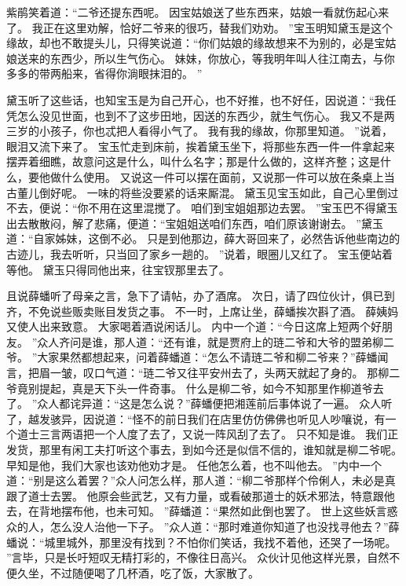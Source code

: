 紫鹃笑着道：“二爷还提东西呢。
因宝姑娘送了些东西来，姑娘一看就伤起心来了。
我正在这里劝解，恰好二爷来的很巧，替我们劝劝。
”宝玉明知黛玉是这个缘故，却也不敢提头儿，只得笑说道：“你们姑娘的缘故想来不为别的，必是宝姑娘送来的东西少，所以生气伤心。
妹妹，你放心，等我明年叫人往江南去，与你多多的带两船来，省得你淌眼抹泪的。
”\par
黛玉听了这些话，也知宝玉是为自己开心，也不好推，也不好任，因说道：“我任凭怎么没见世面，也到不了这步田地，因送的东西少，就生气伤心。
我又不是两三岁的小孩子，你也忒把人看得小气了。
我有我的缘故，你那里知道。
”说着，眼泪又流下来了。
宝玉忙走到床前，挨着黛玉坐下，将那些东西一件一件拿起来摆弄着细瞧，故意问这是什么，叫什么名字；那是什么做的，这样齐整；这是什么，要他做什么使用。
又说这一件可以摆在面前，又说那一件可以放在条桌上当古董儿倒好呢。
一味的将些没要紧的话来厮混。
黛玉见宝玉如此，自己心里倒过不去，便说：“你不用在这里混搅了。
咱们到宝姐姐那边去罢。
”宝玉巴不得黛玉出去散散闷，解了悲痛，便道：“宝姐姐送咱们东西，咱们原该谢谢去。
”黛玉道：“自家姊妹，这倒不必。
只是到他那边，薛大哥回来了，必然告诉他些南边的古迹儿，我去听听，只当回了家乡一趟的。
”说着，眼圈儿又红了。
宝玉便站着等他。
黛玉只得同他出来，往宝钗那里去了。
\par
且说薛蟠听了母亲之言，急下了请帖，办了酒席。
次日，请了四位伙计，俱已到齐，不免说些贩卖账目发货之事。
不一时，上席让坐，薛蟠挨次斟了酒。
薛姨妈又使人出来致意。
大家喝着酒说闲话儿。
内中一个道：“今日这席上短两个好朋友。
”众人齐问是谁，那人道：“还有谁，就是贾府上的琏二爷和大爷的盟弟柳二爷。
”大家果然都想起来，问着薛蟠道：“怎么不请琏二爷和柳二爷来？”薛蟠闻言，把眉一皱，叹口气道：“琏二爷又往平安州去了，头两天就起了身的。
那柳二爷竟别提起，真是天下头一件奇事。
什么是柳二爷，如今不知那里作柳道爷去了。
”众人都诧异道：“这是怎么说？”薛蟠便把湘莲前后事体说了一遍。
众人听了，越发骇异，因说道：“怪不的前日我们在店里仿仿佛佛也听见人吵嚷说，有一个道士三言两语把一个人度了去了，又说一阵风刮了去了。
只不知是谁。
我们正发货，那里有闲工夫打听这个事去，到如今还是似信不信的，谁知就是柳二爷呢。
早知是他，我们大家也该劝他劝才是。
任他怎么着，也不叫他去。
”内中一个道：“别是这么着罢？”众人问怎么样，那人道：“柳二爷那样个伶俐人，未必是真跟了道士去罢。
他原会些武艺，又有力量，或看破那道士的妖术邪法，特意跟他去，在背地摆布他，也未可知。
”薛蟠道：“果然如此倒也罢了。
世上这些妖言惑众的人，怎么没人治他一下子。
”众人道：“那时难道你知道了也没找寻他去？”薛蟠说：“城里城外，那里没有找到？不怕你们笑话，我找不着他，还哭了一场呢。
”言毕，只是长吁短叹无精打彩的，不像往日高兴。
众伙计见他这样光景，自然不便久坐，不过随便喝了几杯酒，吃了饭，大家散了。
\par
